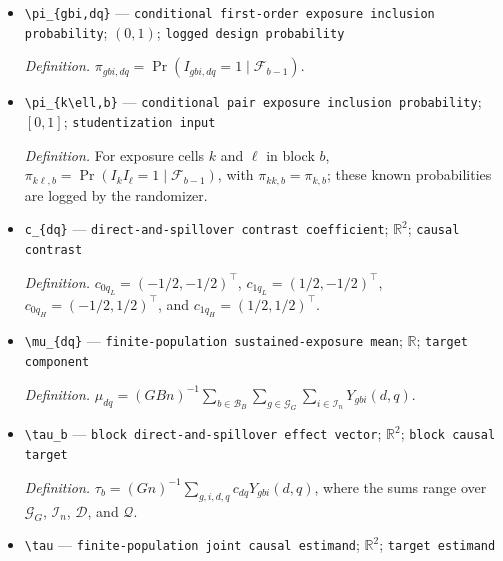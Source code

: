 \documentclass{article}
\begin{document}
\begin{itemize}
  \par\smallskip\noindent\emph{Definition.} \(I_{gbi,dq}=\mathbf 1\{Q_{gb}=q,A_{gbi}=d\}\).
  \item \texttt{\textbackslash{}\allowbreak{}pi\_\allowbreak{}\{gbi,\allowbreak{}dq\}\allowbreak{}} --- \texttt{conditional first-\allowbreak{}order exposure inclusion probability}; \((0,1)\); \texttt{logged design probability}
  \par\smallskip\noindent\emph{Definition.} \(\pi_{gbi,dq}=\Pr(I_{gbi,dq}=1\mid\mathcal F_{b-1})\).
  \item \texttt{\textbackslash{}\allowbreak{}pi\_\allowbreak{}\{k\textbackslash{}\allowbreak{}ell,\allowbreak{}b\}\allowbreak{}} --- \texttt{conditional pair exposure inclusion probability}; \([0,1]\); \texttt{studentization input}
  \par\smallskip\noindent\emph{Definition.} For exposure cells \(k\) and \(\ell\) in block \(b\), \(\pi_{k\ell,b}=\Pr(I_kI_\ell=1\mid\mathcal F_{b-1})\), with \(\pi_{kk,b}=\pi_{k,b}\); these known probabilities are logged by the randomizer.
  \item \texttt{c\_\allowbreak{}\{dq\}\allowbreak{}} --- \texttt{direct-\allowbreak{}and-\allowbreak{}spillover contrast coefficient}; \(\mathbb R^2\); \texttt{causal contrast}
  \par\smallskip\noindent\emph{Definition.} \(c_{0q_L}=(-1/2,-1/2)^\top\), \(c_{1q_L}=(1/2,-1/2)^\top\), \(c_{0q_H}=(-1/2,1/2)^\top\), and \(c_{1q_H}=(1/2,1/2)^\top\).
  \item \texttt{\textbackslash{}\allowbreak{}mu\_\allowbreak{}\{dq\}\allowbreak{}} --- \texttt{finite-\allowbreak{}population sustained-\allowbreak{}exposure mean}; \(\mathbb R\); \texttt{target component}
  \par\smallskip\noindent\emph{Definition.} \(\mu_{dq}=(GBn)^{-1}\sum_{b\in\mathcal B_B}\sum_{g\in\mathcal G_G}\sum_{i\in\mathcal I_n}Y_{gbi}(d,q)\).
  \item \texttt{\textbackslash{}\allowbreak{}tau\_\allowbreak{}b} --- \texttt{block direct-\allowbreak{}and-\allowbreak{}spillover effect vector}; \(\mathbb R^2\); \texttt{block causal target}
  \par\smallskip\noindent\emph{Definition.} \(\tau_b=(Gn)^{-1}\sum_{g,i,d,q}c_{dq}Y_{gbi}(d,q)\), where the sums range over \(\mathcal G_G\), \(\mathcal I_n\), \(\mathcal D\), and \(\mathcal Q\).
  \item \texttt{\textbackslash{}\allowbreak{}tau} --- \texttt{finite-\allowbreak{}population joint causal estimand}; \(\mathbb R^2\); \texttt{target estimand}

\end{itemize}
\end{document}

